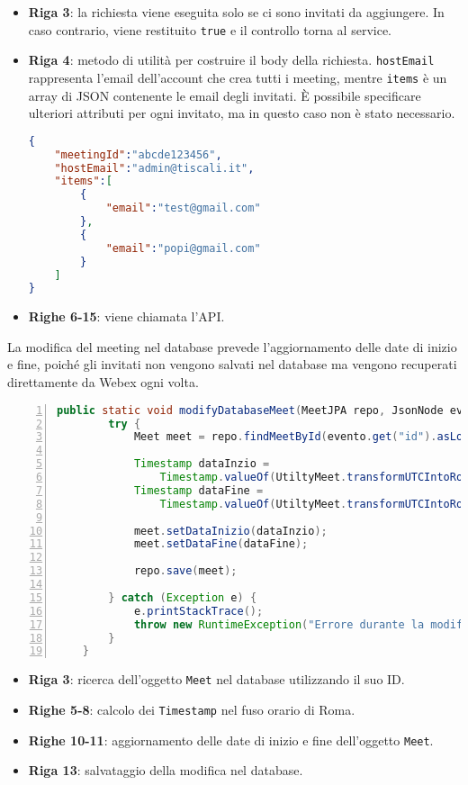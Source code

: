\begin{itemize}
    \item \textbf{Riga 3}: la richiesta viene eseguita solo se ci sono invitati da aggiungere. In caso contrario, viene restituito 
    \texttt{true} e il controllo torna al service.

    \item \textbf{Riga 4}: metodo di utilità per costruire il body della richiesta. 
    \texttt{hostEmail} rappresenta l'email dell'account che crea tutti i meeting, 
    mentre \texttt{items} è un array di JSON contenente le email degli invitati. È possibile specificare ulteriori attributi
     per ogni invitato, ma in questo caso non è stato necessario.
    \begin{lstlisting}[language=json,firstnumber=1]
{
    "meetingId":"abcde123456",
    "hostEmail":"admin@tiscali.it",
    "items":[
        {
            "email":"test@gmail.com"
        },
        {
            "email":"popi@gmail.com"
        }
    ]
}
    \end{lstlisting}

    \item \textbf{Righe 6-15}: viene chiamata l'API.
\end{itemize}
La modifica del meeting nel database prevede l'aggiornamento delle date di inizio e fine, 
poiché gli invitati non vengono salvati nel database ma vengono recuperati direttamente da Webex ogni volta.
\begin{lstlisting}[language=java, frame=lines, basicstyle=\ttfamily\scriptsize, numbers=left]
    public static void modifyDatabaseMeet(MeetJPA repo, JsonNode evento) {
		try {
			Meet meet = repo.findMeetById(evento.get("id").asLong());

			Timestamp dataInzio = 
                Timestamp.valueOf(UtiltyMeet.transformUTCIntoRomeTimezone(evento.get("start").asText()));
			Timestamp dataFine = 
                Timestamp.valueOf(UtiltyMeet.transformUTCIntoRomeTimezone(evento.get("end").asText()));

			meet.setDataInizio(dataInzio);
			meet.setDataFine(dataFine);

			repo.save(meet);

		} catch (Exception e) {
			e.printStackTrace();
			throw new RuntimeException("Errore durante la modifica del meeting a database", e);
		}
	}
\end{lstlisting}
\begin{itemize}
    \item \textbf{Riga 3}: ricerca dell'oggetto \texttt{Meet} nel database utilizzando il suo ID.
    \item \textbf{Righe 5-8}: calcolo dei \texttt{Timestamp} nel fuso orario di Roma.
    \item \textbf{Righe 10-11}: aggiornamento delle date di inizio e fine dell'oggetto \texttt{Meet}.
    \item \textbf{Riga 13}: salvataggio della modifica nel database.
\end{itemize}